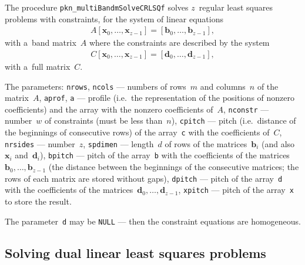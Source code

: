 \begin{sloppypar}
The procedure \texttt{pkn\_multiBandmSolveCRLSQf} solves $z$~regular
least squares problems with constraints, for the system
of linear equations
\begin{align*}
  A[\bm{x}_0,\ldots,\bm{x}_{z-1}] = [\bm{b}_0,\ldots,\bm{b}_{z-1}],
\end{align*}
with a~band matrix~$A$ where the constraints are described by the system
\begin{align*}
  C[\bm{x}_0,\ldots,\bm{x}_{z-1}] = [\bm{d}_0,\ldots,\bm{d}_{z-1}],
\end{align*}
with a~full matrix~$C$.%
\end{sloppypar}

The parameters:
\texttt{nrows}, \texttt{ncols} --- numbers of rows~$m$ and columns~$n$ of the
matrix~$A$,
\texttt{aprof}, \texttt{a} --- profile (i.e.\ the representation of the positions
of nonzero coefficients) and the array with the nonzero coefficients of~$A$,
\texttt{nconstr} --- number~$w$ of constraints
(must be less than~$n$), \texttt{cpitch} --- pitch (i.e.\ distance
of the beginnings of consecutive rows) of the array~\texttt{c} with the
coefficients of~$C$,
\texttt{nrsides} --- number~$z$, \texttt{spdimen} --- length~$d$
of rows of the matrices~$\bm{b}_i$ (and also~$\bm{x}_i$ and~$\bm{d}_i$),
\texttt{bpitch} --- pitch of the array~\texttt{b} with the coefficients
of the matrices $\bm{b}_0,\ldots,\bm{b}_{z-1}$ (the distance
between the beginnings of the consecutive matrices; the rows of each matrix
are stored without gaps),
\texttt{dpitch} --- pitch of the array~\texttt{d} with
the coefficients of the matrices~$\bm{d}_0,\ldots,\bm{d}_{z-1}$,
\texttt{xpitch} --- pitch of the array~\texttt{x} to store the result.

The parameter~\texttt{d} may be \texttt{NULL} --- then the constraint
equations are homogeneous.



\subsection{Solving dual linear least squares problems}

